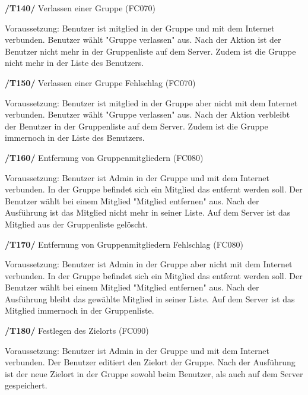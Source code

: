 \begin{itemize}
\begin{itemize}
\begin{itemize}
\begin{itemize}
\textbf{/T140/} Verlassen einer Gruppe (FC070)\\
\begin{itemize}
Voraussetzung: Benutzer ist mitglied in der Gruppe und mit dem Internet verbunden.
Benutzer wählt "Gruppe verlassen" aus.
Nach der Aktion ist der Benutzer nicht mehr in der Gruppenliste auf dem Server.
Zudem ist die Gruppe nicht mehr in der Liste des Benutzers.
\end{itemize}

\textbf{/T150/} Verlassen einer Gruppe Fehlschlag (FC070)\\
\begin{itemize}
Voraussetzung: Benutzer ist mitglied in der Gruppe aber nicht mit dem Internet verbunden.
Benutzer wählt "Gruppe verlassen" aus.
Nach der Aktion verbleibt der Benutzer in der Gruppenliste auf dem Server.
Zudem ist die Gruppe immernoch in der Liste des Benutzers.
\end{itemize}

\textbf{/T160/} Entfernung von Gruppenmitgliedern (FC080)\\
\begin{itemize}
Voraussetzung: Benutzer ist Admin in der Gruppe und mit dem Internet verbunden.
In der Gruppe befindet sich ein Mitglied das entfernt werden soll.
Der Benutzer wählt bei einem Mitglied "Mitglied entfernen" aus.
Nach der Ausführung ist das Mitglied nicht mehr in seiner Liste.
Auf dem Server ist das Mitglied aus der Gruppenliste gelöscht.
\end{itemize}

\textbf{/T170/} Entfernung von Gruppenmitgliedern Fehlschlag (FC080)\\
\begin{itemize}
Voraussetzung: Benutzer ist Admin in der Gruppe aber nicht mit dem Internet verbunden.
In der Gruppe befindet sich ein Mitglied das entfernt werden soll.
Der Benutzer wählt bei einem Mitglied "Mitglied entfernen" aus.
Nach der Ausführung bleibt das gewählte Mitglied in seiner Liste.
Auf dem Server ist das Mitglied immernoch in der Gruppenliste.
\end{itemize}

\textbf{/T180/} Festlegen des Zielorts (FC090)\\
\begin{itemize}
Voraussetzung: Benutzer ist Admin in der Gruppe und mit dem Internet verbunden.
Der Benutzer editiert den Zielort der Gruppe.
Nach der Ausführung ist der neue Zielort in der Gruppe sowohl beim Benutzer,
als auch auf dem Server gespeichert.
\end{itemize}


\end{itemize}
\end{itemize}
\end{itemize}
\end{itemize}
